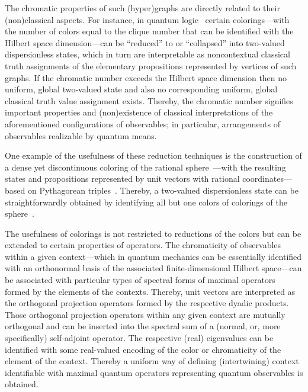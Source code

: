 \documentclass[%
12pt,
prereprint,
showpacs,
showkeys,
preprintnumbers,
amsmath,amssymb,
aps,
pra,
longbibliography,
notitlepage
]{revtex4-1}
\theoremstyle{definition}
\begin{document}
        The chromatic properties of such (hyper)graphs are directly related to their (non)classical aspects.
        For instance, in quantum logic~\cite{birkhoff-36}
        certain colorings---with the number of colors equal to the clique number that can be identified with the Hilbert space dimension---can be ``reduced'' to or ``collapsed'' into two-valued dispersionless states, which in turn are interpretable as noncontextual classical truth assignments of the elementary propositions represented by vertices of such graphs. If the chromatic number exceeds  the Hilbert space dimension then no uniform, global two-valued state and also no corresponding uniform, global classical truth value assignment exists.
        Thereby, the chromatic number signifies important properties and (non)existence of classical interpretations of the aforementioned
        configurations of observables; in particular, arrangements of observables realizable by quantum means.

        One example of the usefulness of these reduction techniques is the construction of a dense yet discontinuous coloring
        of the rational sphere~\cite{meyer:99}---with the resulting states and propositions
        represented by unit vectors with rational coordinates---based on Pythagorean triples~\cite{havlicek-2000}.
        Thereby, a two-valued dispersionless state can be straightforwardly obtained by identifying all but one colors
        of colorings of the sphere~\cite{godsil-zaks}.

        The usefulness of colorings is not restricted to reductions of the colors but can be extended to certain properties of operators.
        The chromaticity of observables within a given context---which in quantum mechanics can be essentially identified with an orthonormal basis
        of the associated finite-dimensional Hilbert space---can be associated
        with particular types of spectral forms of maximal operators~\cite[\S~84]{halmos-vs} formed by the
        elements of the contexts.
        Thereby, unit vectors are interpreted as the orthogonal projection operators formed by the respective dyadic products.
        Those orthogonal projection operators within any given context are mutually orthogonal and can be
        inserted into the spectral sum of a (normal, or, more specifically) self-adjoint operator.
        The respective (real) eigenvalues can be identified with some real-valued encoding of the color or chromaticity of the element of the context.
        Thereby a uniform way of defining (intertwining) context identifiable with maximal quantum operators representing quantum observables is obtained.
\end{document}
